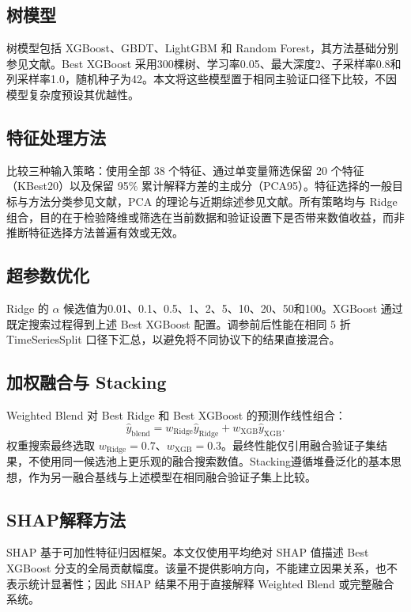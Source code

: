 \documentclass[UTF8,a4paper,twocolumn,zihao=5,fontset=none]{ctexart}
\begin{document}
\subsection{树模型}
树模型包括 XGBoost、GBDT、LightGBM 和 Random Forest，其方法基础分别参见文献\citep{chen2016xgboost,friedman2001gbdt,ke2017lightgbm,breiman2001randomforest}。Best XGBoost 采用300棵树、学习率0.05、最大深度2、子采样率0.8和列采样率1.0，随机种子为42。本文将这些模型置于相同主验证口径下比较，不因模型复杂度预设其优越性。

\subsection{特征处理方法}
比较三种输入策略：使用全部 38 个特征、通过单变量筛选保留 20 个特征（KBest20）以及保留 95\% 累计解释方差的主成分（PCA95）。特征选择的一般目标与方法分类参见文献\citep{guyon2003feature_selection}，PCA 的理论与近期综述参见文献\citep{jolliffe2016pca}。所有策略均与 Ridge 组合，目的在于检验降维或筛选在当前数据和验证设置下是否带来数值收益，而非推断特征选择方法普遍有效或无效。

\subsection{超参数优化}
Ridge 的 $\alpha$ 候选值为0.01、0.1、0.5、1、2、5、10、20、50和100。XGBoost 通过既定搜索过程得到上述 Best XGBoost 配置。调参前后性能在相同 5 折 TimeSeriesSplit 口径下汇总，以避免将不同协议下的结果直接混合。

\subsection{加权融合与 Stacking}
Weighted Blend 对 Best Ridge 和 Best XGBoost 的预测作线性组合：
\begin{equation}
 \hat y_{\mathrm{blend}}=w_{\mathrm{Ridge}}\hat y_{\mathrm{Ridge}}+w_{\mathrm{XGB}}\hat y_{\mathrm{XGB}}.
\end{equation}
权重搜索最终选取 $w_{\mathrm{Ridge}}=0.7$、$w_{\mathrm{XGB}}=0.3$。最终性能仅引用融合验证子集结果，不使用同一候选池上更乐观的融合搜索数值。Stacking遵循堆叠泛化的基本思想\citep{wolpert1992stacking}，作为另一融合基线与上述模型在相同融合验证子集上比较。

\subsection{SHAP解释方法}
SHAP 基于可加性特征归因框架\citep{lundberg2017shap}。本文仅使用平均绝对 SHAP 值描述 Best XGBoost 分支的全局贡献幅度。该量不提供影响方向，不能建立因果关系，也不表示统计显著性；因此 SHAP 结果不用于直接解释 Weighted Blend 或完整融合系统。
\end{document}
